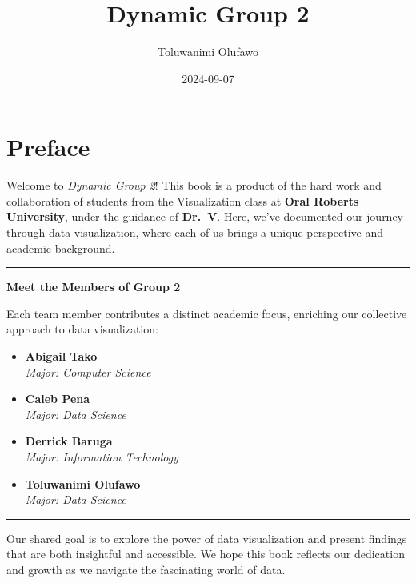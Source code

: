 \documentclass[
  letterpaper,
  DIV=11,
  numbers=noendperiod]{scrreprt}
\title{Dynamic Group 2}
\author{Toluwanimi Olufawo}
\date{2024-09-07}
\renewcommand*\contentsname{Table of contents}
\newcommand\contentsname{Table of contents}
\begin{document}
\maketitle

\renewcommand*\contentsname{Table of contents}
{
\hypersetup{linkcolor=}
\setcounter{tocdepth}{2}
\tableofcontents
}


\chapter*{Preface}\label{preface}


Welcome to \emph{Dynamic Group 2}! This book is a product of the hard
work and collaboration of students from the Visualization class at
\textbf{Oral Roberts University}, under the guidance of \textbf{Dr.~V}.
Here, we've documented our journey through data visualization, where
each of us brings a unique perspective and academic background.

\begin{center}\rule{0.5\linewidth}{0.5pt}\end{center}

\textbf{Meet the Members of Group 2}

Each team member contributes a distinct academic focus, enriching our
collective approach to data visualization:

\begin{itemize}
\item
  \textbf{Abigail Tako}\\
  \emph{Major: Computer Science}
\item
  \textbf{Caleb Pena}\\
  \emph{Major: Data Science}
\item
  \textbf{Derrick Baruga}\\
  \emph{Major: Information Technology}
\item
  \textbf{Toluwanimi Olufawo}\\
  \emph{Major: Data Science}
\end{itemize}

\begin{center}\rule{0.5\linewidth}{0.5pt}\end{center}

Our shared goal is to explore the power of data visualization and
present findings that are both insightful and accessible. We hope this
book reflects our dedication and growth as we navigate the fascinating
world of data.
\end{document}
